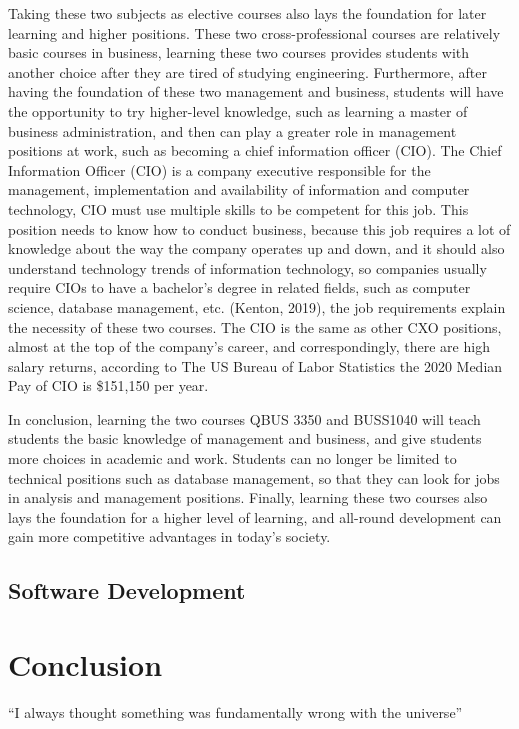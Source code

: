 \documentclass[12pt]{article}
\begin{document}
Taking these two subjects as elective courses also lays the foundation for later learning and higher positions. These two cross-professional courses are relatively basic courses in business, learning these two courses provides students with another choice after they are tired of studying engineering. Furthermore, after having the foundation of these two management and business, students will have the opportunity to try higher-level knowledge, such as learning a master of business administration, and then can play a greater role in management positions at work, such as becoming a chief information officer (CIO). The Chief Information Officer (CIO) is a company executive responsible for the management, implementation and availability of information and computer technology, CIO must use multiple skills to be competent for this job. This position needs to know how to conduct business, because this job requires a lot of knowledge about the way the company operates up and down, and it should also understand technology trends of information technology, so companies usually require CIOs to have a bachelor's degree in related fields, such as computer science, database management, etc. (Kenton, 2019), the job requirements explain the necessity of these two courses. The CIO is the same as other CXO positions, almost at the top of the company's career, and correspondingly, there are high salary returns, according to The US Bureau of Labor Statistics the 2020 Median Pay of CIO is \$151,150 per year.

In conclusion, learning the two courses QBUS 3350 and BUSS1040 will teach students the basic knowledge of management and business, and give students more choices in academic and work. Students can no longer be limited to technical positions such as database management, so that they can look for jobs in analysis and management positions. Finally, learning these two courses also lays the foundation for a higher level of learning, and all-round development can gain more competitive advantages in today's society.


\subsection{Software Development}

\section{Conclusion}
``I always thought something was fundamentally wrong with the universe\cite{Burridge_2018a}''
{}

% 
\end{document}
